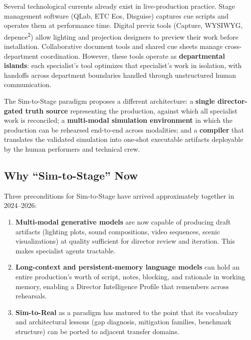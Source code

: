 \documentclass[11pt]{article}
\begin{document}
Several technological currents already exist in live-production practice.
Stage management software (QLab, ETC Eos, Disguise) captures cue scripts
and operates them at performance time.  Digital previz tools (Capture,
WYSIWYG, depence\textsuperscript{2}) allow lighting and projection
designers to preview their work before installation.  Collaborative document
tools and shared cue sheets manage cross-department coordination.  However,
these tools operate as \textbf{departmental islands}: each specialist's
tool optimizes that specialist's work in isolation, with handoffs across
department boundaries handled through unstructured human communication.

The Sim-to-Stage paradigm proposes a different architecture: a \textbf{single
director-gated truth source} representing the production, against which all
specialist work is reconciled; a \textbf{multi-modal simulation
environment} in which the production can be rehearsed end-to-end across
modalities; and a \textbf{compiler} that translates the validated simulation
into one-shot executable artifacts deployable by the human performers and
technical crew.

\subsection{Why ``Sim-to-Stage'' Now}

Three preconditions for Sim-to-Stage have arrived approximately together
in 2024--2026:

\begin{enumerate}
\item \textbf{Multi-modal generative models} are now capable of producing
      draft artifacts (lighting plots, sound compositions, video sequences,
      scenic visualizations) at quality sufficient for director review and
      iteration.  This makes specialist agents tractable.
\item \textbf{Long-context and persistent-memory language models} can hold
      an entire production's worth of script, notes, blocking, and rationale
      in working memory, enabling a Director Intelligence Profile that
      remembers across rehearsals.
\item \textbf{Sim-to-Real} as a paradigm has matured to the point that its
      vocabulary and architectural lessons (gap diagnosis, mitigation
      families, benchmark structure) can be ported to adjacent transfer
      domains.
\end{enumerate}
\end{document}
